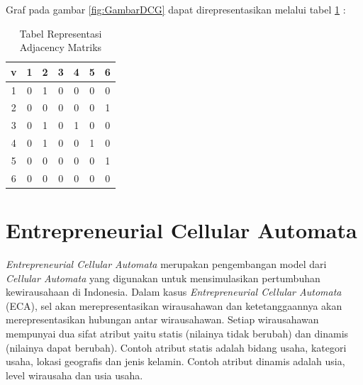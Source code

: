 Graf pada gambar \ref{fig:GambarDCG} dapat direpresentasikan melalui tabel \ref{tabelDCG} :

\begin{table}[H]
\centering
\caption{Tabel Representasi Adjacency Matriks}
\begin{tabular}{|c|c|c|c|c|c|c|}
\hline
v & 1 & 2 & 3 & 4 & 5 & 6 \\
\hline
1 & 0 & 1 & 0 & 0 & 0 & 0 \\
\hline
2 & 0 & 0 & 0 & 0 & 0 & 1 \\
\hline
3 & 0 & 1 & 0 & 1 & 0 & 0 \\
\hline
4 & 0 & 1 & 0 & 0 & 1 & 0 \\
\hline
5 & 0 & 0 & 0 & 0 & 0 & 1 \\
\hline
6 & 0 & 0 & 0 & 0 & 0 & 0 \\
\hline
\end{tabular}
\label{tabelDCG}
\end{table}


\section{Entrepreneurial Cellular Automata}
\label{sec:ECA}
\textit{Entrepreneurial Cellular Automata} merupakan pengembangan model dari \textit{Cellular Automata} yang digunakan untuk mensimulasikan pertumbuhan kewirausahaan di Indonesia. Dalam kasus \textit{Entrepreneurial Cellular Automata} (ECA), sel akan merepresentasikan wirausahawan dan ketetanggaannya akan merepresentasikan hubungan antar wirausahawan. Setiap wirausahawan mempunyai dua sifat atribut yaitu statis (nilainya tidak berubah) dan dinamis (nilainya dapat berubah). Contoh atribut statis adalah bidang usaha, kategori usaha, lokasi geografis dan jenis kelamin. Contoh atribut dinamis adalah usia, level wirausaha dan usia usaha.  

